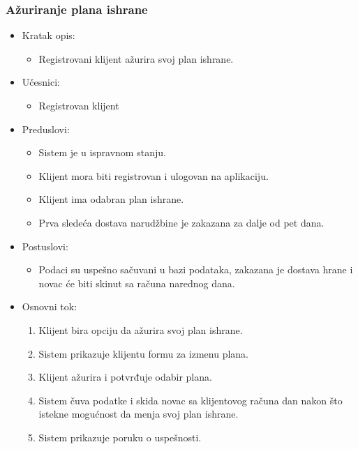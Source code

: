 \subsubsection{Ažuriranje plana ishrane}

\begin{itemize}
    \item Kratak opis:
        \begin{itemize}
            \item Registrovani klijent ažurira svoj plan ishrane.
        \end{itemize}
    \item Učesnici:
        \begin{itemize}
            \item Registrovan klijent
        \end{itemize}
    \item Preduslovi:
        \begin{itemize}
            \item Sistem je u ispravnom stanju.
            \item Klijent mora biti registrovan i ulogovan na aplikaciju.
            \item Klijent ima odabran plan ishrane.
            \item Prva sledeća dostava narudžbine je zakazana za dalje od pet dana.
        \end{itemize}
    \item Postuslovi:
        \begin{itemize}
            \item Podaci su uspešno sačuvani u bazi podataka, zakazana je dostava hrane i novac će biti skinut sa računa narednog dana.
        \end{itemize}
    \item Osnovni tok:
        \begin{enumerate}
            \item Klijent bira opciju da ažurira svoj plan ishrane.
            \item Sistem prikazuje klijentu formu za izmenu plana.
            \item Klijent ažurira i potvrđuje odabir plana.
            \item Sistem čuva podatke i skida novac sa klijentovog računa dan nakon što istekne mogućnost da menja svoj plan ishrane.
            \item Sistem prikazuje poruku o uspešnosti. 
        \end{enumerate}

\end{itemize}
